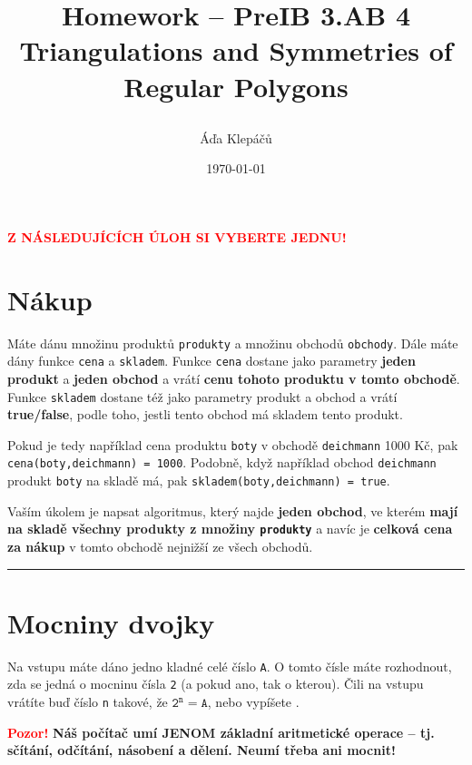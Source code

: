 \documentclass[a4paper,11pt]{article}
\title{\Huge\textsf{Homework -- PreIB 3.AB 4}\\
 \Large\textsf{Triangulations and Symmetries of Regular Polygons}
 \author{Áďa Klepáčů}
 \date{\today}
}
\newcommand{\clr}{\textcolor{red}}
\begin{document}
\thispagestyle{fancy}

\clr{\textbf{\uppercase{Z následujících úloh si vyberte jednu!}}}

\section*{Nákup}
Máte dánu množinu produktů \texttt{produkty} a množinu obchodů \texttt{obchody}.
Dále máte dány funkce \texttt{cena} a \texttt{skladem}. Funkce \texttt{cena}
dostane jako parametry \textbf{jeden produkt} a \textbf{jeden obchod} a vrátí
\textbf{cenu tohoto produktu v tomto obchodě}. Funkce \texttt{skladem} dostane
též jako parametry produkt a obchod a vrátí \textbf{true/false}, podle toho,
jestli tento obchod má skladem tento produkt.

Pokud je tedy například cena produktu \texttt{boty} v obchodě \texttt{deichmann}
1000 Kč, pak \texttt{cena(boty,deichmann) = 1000}. Podobně, když například
obchod \texttt{deichmann} produkt \texttt{boty} na skladě má, pak
\texttt{skladem(boty,deichmann) = true}.

Vaším úkolem je napsat algoritmus, který najde \textbf{jeden obchod}, ve kterém
\textbf{mají na skladě všechny produkty z množiny \texttt{produkty}} a navíc je
\textbf{celková cena za nákup} v tomto obchodě nejnižší ze všech obchodů.

\vspace*{2em}

\hrule

\section*{Mocniny dvojky}
Na vstupu máte dáno jedno kladné celé číslo \texttt{A}. O tomto čísle máte
rozhodnout, zda se jedná o mocninu čísla \texttt{2} (a pokud ano, tak o kterou).
Čili na vstupu vrátíte buď číslo \texttt{n} takové, že $\mathtt{2^{n} = A}$,
nebo vypíšete \texttt{}.

\clr{\textbf{Pozor!}} \textbf{Náš počítač umí JENOM základní aritmetické operace
-- tj. sčítání, odčítání, násobení a dělení. Neumí třeba ani mocnit!}
\end{document}
